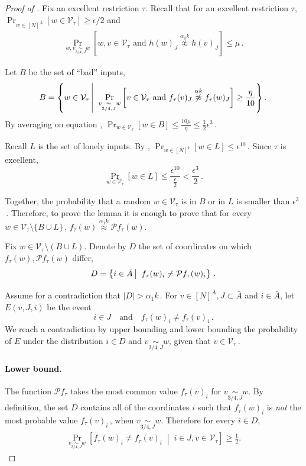 \documentclass{toc}
\newcommand{\Prob}[2][]{\Pr_{{#1}}\left[#2\right]} %
\newcommand{\brac}[1]{[#1]} %
\newcommand{\abs}[1]{\lvert#1\rvert} %
\newcommand{\given}{\;\middle\vert\;} %
\newcommand\sett[2]{\left\{ #1 \left| \; \vphantom{#1 #2} \right. #2  \right\}} %
\newcommand\f{f} %
\newcommand\h{h} %
\newcommand\bh{\mathcal{P}\f_\tau} %
\newcommand\neql[1]{\stackrel{{#1}}{ \approx}} %
\newcommand\neqg[1]{\stackrel{{#1}}{ \not\approx}} %
\newcommand\cons{\mathcal{V}} %
\newcommand\cor[1]{\underset{\scriptscriptstyle#1}{\sim}} %
\begin{document}
\begin{proof}[Proof of ]
	Fix an excellent restriction $\tau$. 
	Recall that for an excellent restriction $\tau$, $\Pr_{w\in \brac{N}^{\bar{A}}}[w\in \cons_\tau]\geq 
	\epsilon/2$ %
	 and
	\begin{align}\label{eq:recall excellent}
		\Prob[w,v\cor{3/4,J}{w}]{  w,v\in \cons_\tau\textrm{ and } \h(w)_J\neqg{\alpha_0 k}\h(v)_J}\leq \mu\,.
	\end{align}
	
    Let $B$ be the set of ``bad'' inputs,
	\[ B = \sett{w\in \cons_\tau}{\Prob[v\cor{3/4,J}w]{v\in \cons_\tau \textrm{ and } \f_\tau(v)_J\neqg{\alpha k}\f_\tau(w)_J} \geq \frac{\eta}{10}}.\,\]%
	By averaging on equation , $\Pr_{w\in\cons_\tau}[w\in B]\leq \frac{10\mu}{\eta}\leq \frac{1}{2}\epsilon^3$\,. 
	
	Recall $L$ is the set of lonely inputs. By , $\Pr_{w\in[N]^k}[w\in L]\leq \epsilon^{10}$\,. Since $\tau$ is excellent, 
	\[\Pr_{w\in\cons_\tau}[w\in L] \leq \frac{\epsilon^{10}}{\frac{\epsilon}{2}}< \frac{\epsilon^3}{2}\,. \]%
	
	Together, the probability that a random $w\in\cons_\tau$ is in $B$ or in $L$ is smaller than $\epsilon^3$\,. 
	Therefore, to prove the lemma it is enough to prove that for every $w\in \cons_\tau\setminus \{B\cup L\}$\,, $\f_\tau(w)\neql{\alpha_1 k}\bh(w)$.
	
	Fix $w\in\cons_\tau\setminus(B\cup L)$. Denote by $D$ the set of coordinates on which $\f_\tau(w),\bh(w)$ differ,
	\[ D = \sett{i\in \bar{A}}{\f_\tau(w)_i \neq \bh(w)_i}\,.\] %
	
Assume %
for  %
a contradiction that $\abs{D}> \alpha_1 k$\,. For $v\in[N]^{\bar{A}},J\subset \bar{A}$ and $i\in\bar{A} $, let $E(v,J,i)$  be the event
	\[ i\in J \quad\textrm{and}\quad  \f_\tau(w)_i \neq \f_\tau(v)_i\,.\]%
	We reach a contradiction by upper bounding and lower bounding the probability of $E$ under the distribution $i\in D$ and $v\cor{3/4,J}w$, given that $v\in \cons_\tau$\,.
	
	\paragraph*{Lower bound.}
	The function $\bh$ takes the most common value $\f_\tau(v)_i$ for $v\cor{3/4,J}w$. By definition, the set $D$ contains all of the coordinates $i$ such that $\f_\tau(w)_i$ is \emph{not} the most probable value $\f_\tau(v)_i$\,, when $v\cor{3/4,J}w$. Therefore for every $i\in D$,
	\begin{align}\label{eq:bad i}
	\Prob[v\cor{3/4,J}w]{\f_\tau(w)_i \neq \f_\tau(v)_i \given i\in J, v\in \cons_\tau} \geq \frac{1}{2}.
	\end{align}
	

\end{proof}
\end{document}

